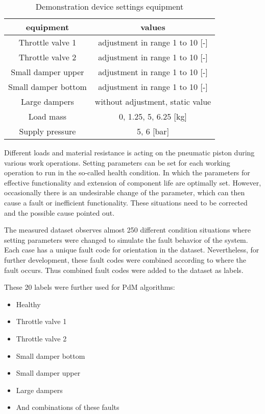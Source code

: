 \begin{table}[h]
    \centering
    \begin{tabular}{|c|c|}
        \hline
        \textbf{equipment}  & \textbf{values} \\  \hline
        Throttle valve 1    & adjustment in range 1 to 10 [-] \\
        Throttle valve 2    & adjustment in range 1 to 10 [-] \\
        Small damper upper  & adjustment in range 1 to 10 [-] \\
        Small damper bottom & adjustment in range 1 to 10 [-] \\
        Large dampers       & without adjustment, static value \\
        Load mass           & 0, 1.25, 5, 6.25 [kg] \\
        Supply pressure     & 5, 6 [bar]    \\
        \hline
    \end{tabular}
    \caption{Demonstration device settings equipment}
    \label{tab:setting}
\end{table}


Different loads and material resistance is acting on the pneumatic piston
during various work operations. Setting parameters can be set for each
working operation to run in the so-called health condition. In which the
parameters for effective functionality and extension of component life are
optimally set. However, occasionally there is an undesirable change of the
parameter, which can then cause a fault or inefficient functionality. These
situations need to be corrected and the possible cause pointed out.

\newpage
The measured dataset observes almost 250 different condition situations
where setting parameters were changed to simulate the fault behavior of the
system. Each case has a unique fault code for orientation in the dataset.
Nevertheless, for further development, these fault codes were combined
according to where the fault occurs. Thus combined fault codes were added
to the dataset as labels.

These 20 labels were further used for PdM algorithms:

\begin{itemize}
    \item Healthy
    \item Throttle valve 1
    \item Throttle valve 2 
    \item Small damper bottom
    \item Small damper upper
    \item Large dampers 
    \item And combinations of these faults
\end{itemize}


